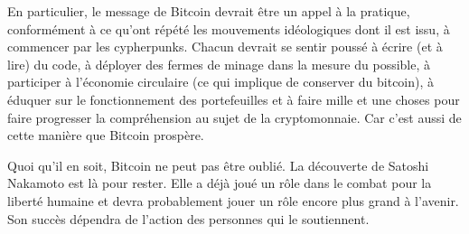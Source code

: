 En particulier, le message de Bitcoin devrait être un appel à la pratique, conformément à ce qu'ont répété les mouvements idéologiques dont il est issu, à commencer par les cypherpunks. Chacun devrait se sentir poussé à écrire (et à lire) du code, à déployer des fermes de minage dans la mesure du possible, à participer à l'économie circulaire (ce qui implique de conserver du bitcoin), à éduquer sur le fonctionnement des portefeuilles et à faire mille et une choses pour faire progresser la compréhension au sujet de la cryptomonnaie. Car c'est aussi de cette manière que Bitcoin prospère.

Quoi qu'il en soit, Bitcoin ne peut pas être oublié. La découverte de Satoshi Nakamoto est là pour rester. Elle a déjà joué un rôle dans le combat pour la liberté humaine et devra probablement jouer un rôle encore plus grand à l'avenir. Son succès dépendra de l'action des personnes qui le soutiennent.

\printendnotes